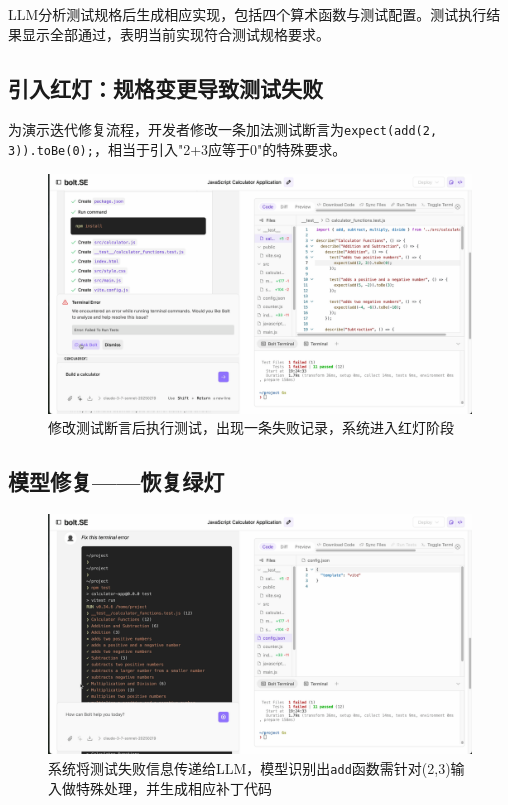 LLM分析测试规格后生成相应实现，包括四个算术函数与测试配置。测试执行结果显示全部通过，表明当前实现符合测试规格要求。

\subsection{引入红灯：规格变更导致测试失败}

为演示迭代修复流程，开发者修改一条加法测试断言为\verb|expect(add(2, 3)).toBe(0);|，相当于引入"2+3应等于0"的特殊要求。

\begin{figure}[htbp]
  \centering
  \includegraphics[width=.9\textwidth]{figures/screenshots/tdd/test_edit_fail.png}
  \caption{修改测试断言后执行测试，出现一条失败记录，系统进入红灯阶段}
  \label{fig:tdd_red}
\end{figure}

\subsection{模型修复——恢复绿灯}

\begin{figure}[htbp]
  \centering
  \includegraphics[width=.9\textwidth]{figures/screenshots/tdd/fix_suggestion.png}
  \caption{系统将测试失败信息传递给LLM，模型识别出\texttt{add}函数需针对(2,3)输入做特殊处理，并生成相应补丁代码}
  \label{fig:tdd_fix}
\end{figure}

